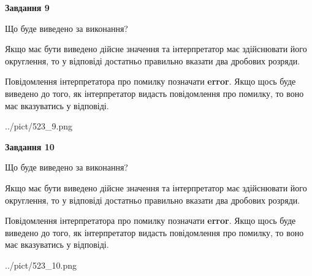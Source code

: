 \documentclass[12pt, ukrainian]{article}
\begin{document}
{\begin {Large}
{\begin {center}\textbf{Завдання 9}\end {center}}\par
Що буде виведено за виконання? \par

Якщо має бути виведено дійсне значення та інтерпретатор має здійснювати його округлення, 
то у відповіді достатньо правильно вказати два дробових розряди.

Повідомлення інтерпретатора про помилку позначати \textbf{error}.
Якщо щось буде виведено до того, як інтерпретатор видасть повідомлення про помилку, 
то воно має вказуватись у відповіді. \par

\begin{center}
	{../pict/523_9.png}
\end{center}
\newpage

{\begin {center}\textbf{Завдання 10}\end {center}}\par
Що буде виведено за виконання? \par

Якщо має бути виведено дійсне значення та інтерпретатор має здійснювати його округлення, 
то у відповіді достатньо правильно вказати два дробових розряди.

Повідомлення інтерпретатора про помилку позначати \textbf{error}.
Якщо щось буде виведено до того, як інтерпретатор видасть повідомлення про помилку, 
то воно має вказуватись у відповіді. \par

\begin{center}
	{../pict/523_10.png}
\end{center}
\newpage

\end {Large}}
\end{document}
